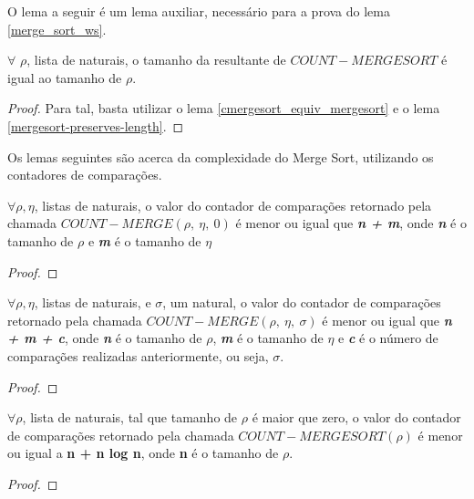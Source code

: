 O lema a seguir é um lema auxiliar, necessário para a prova do lema \ref{merge_sort_ws}.

\begin{lemma}
  \label{cmerge_sort_length}
  $\forall$ $\rho$, lista de naturais, o tamanho da 
  resultante de $COUNT-MERGESORT$ é igual ao tamanho de $\rho$.
\end{lemma}

\begin{proof}
  Para tal, basta utilizar o lema \ref{cmergesort_equiv_mergesort} e o lema
  \ref{mergesort-preserves-length}.
\end{proof}

Os lemas seguintes são acerca da complexidade do Merge Sort, utilizando
os contadores de comparações. 

\begin{lemma}
  \label{count_cmerge_ws}
  $\forall \rho, \eta$, listas de naturais, o valor do contador 
  de comparações retornado pela chamada $COUNT-MERGE(\rho,\ \eta,\ 0)$ é 
  menor ou igual que \textbf{\textit{n + m}}, onde \textbf{\textit{n}}
  é o tamanho de $\rho$ e \textbf{\textit{m}} é o tamanho de $\eta$
\end{lemma}

\begin{proof}
  
\end{proof}

\begin{lemma}
  \label{cmerge_general_case}
  $\forall \rho, \eta$, listas de naturais, e $\sigma$, um natural,
  o valor do contador de comparações retornado pela chamada 
  $COUNT-MERGE(\rho,\ \eta,\ \sigma)$ é menor ou igual que 
  \textbf{\textit{n + m + c}}, onde \textbf{\textit{n}} é o 
  tamanho de $\rho$, \textbf{\textit{m}} é o tamanho de $\eta$ e
  \textbf{\textit{c}} é o número de comparações realizadas anteriormente, 
  ou seja, $\sigma$.
\end{lemma}

\begin{proof}
  
\end{proof}

\begin{lemma}
  \label{merge_sort_ws}
  $\forall \rho$, lista de naturais, tal que tamanho de $\rho$ é maior
  que zero, o valor do contador de comparações retornado pela chamada 
  $COUNT-MERGESORT(\rho)$ é menor ou igual a \textbf{n + n log n}, onde
  \textbf{n} é o tamanho de $\rho$.
\end{lemma}

\begin{proof}
  
\end{proof}